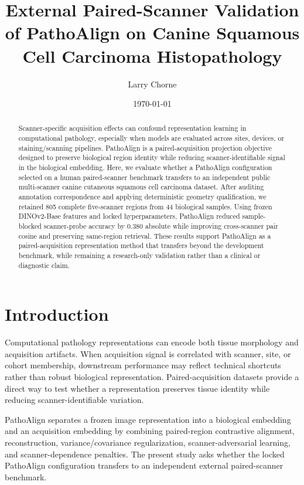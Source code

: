 \documentclass[11pt]{article}
\title{External Paired-Scanner Validation of PathoAlign on Canine Squamous Cell Carcinoma Histopathology}
\author{Larry Chorne}
\date{\today}
\begin{document}
\maketitle

\begin{abstract}
Scanner-specific acquisition effects can confound representation learning in computational pathology, especially when models are evaluated across sites, devices, or staining/scanning pipelines. PathoAlign is a paired-acquisition projection objective designed to preserve biological region identity while reducing scanner-identifiable signal in the biological embedding. Here, we evaluate whether a PathoAlign configuration selected on a human paired-scanner benchmark transfers to an independent public multi-scanner canine cutaneous squamous cell carcinoma dataset. After auditing annotation correspondence and applying deterministic geometry qualification, we retained 805 complete five-scanner regions from 44 biological samples. Using frozen DINOv2-Base features and locked hyperparameters, PathoAlign reduced sample-blocked scanner-probe accuracy by 0.380 absolute while improving cross-scanner pair cosine and preserving same-region retrieval. These results support PathoAlign as a paired-acquisition representation method that transfers beyond the development benchmark, while remaining a research-only validation rather than a clinical or diagnostic claim.
\end{abstract}

\section{Introduction}

Computational pathology representations can encode both tissue morphology and acquisition artifacts. When acquisition signal is correlated with scanner, site, or cohort membership, downstream performance may reflect technical shortcuts rather than robust biological representation. Paired-acquisition datasets provide a direct way to test whether a representation preserves tissue identity while reducing scanner-identifiable variation.

PathoAlign separates a frozen image representation into a biological embedding and an acquisition embedding by combining paired-region contrastive alignment, reconstruction, variance/covariance regularization, scanner-adversarial learning, and scanner-dependence penalties. The present study asks whether the locked PathoAlign configuration transfers to an independent external paired-scanner benchmark.
\end{document}
